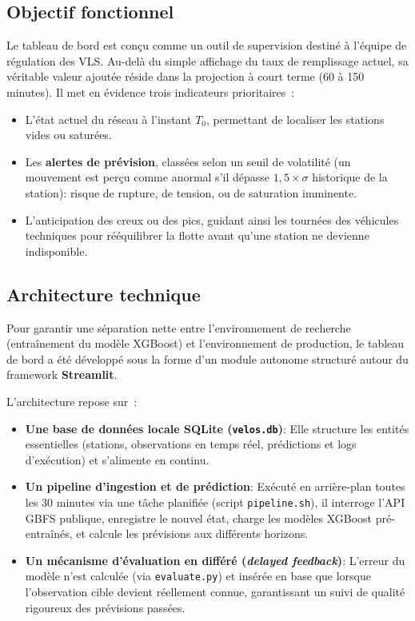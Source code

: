 \documentclass[fleqn, 12pt]{scrartcl}
\begin{document}
\subsection{Objectif fonctionnel}
Le tableau de bord est conçu comme un outil de supervision destiné à l'équipe de régulation des VLS\@. Au-delà du simple affichage du taux de remplissage actuel, sa véritable valeur ajoutée réside dans la projection à court terme (60 à 150 minutes). Il met en évidence trois indicateurs prioritaires~:
\begin{itemize}
    \item L'état actuel du réseau à l'instant $T_0$, permettant de localiser les stations vides ou saturées.
    \item Les \textbf{alertes de prévision}, classées selon un seuil de volatilité (un mouvement est perçu comme anormal s'il dépasse $1{,}5 \times \sigma$ historique de la station): risque de rupture, de tension, ou de saturation imminente.
    \item L'anticipation des creux ou des pics, guidant ainsi les tournées des véhicules techniques pour rééquilibrer la flotte avant qu'une station ne devienne indisponible.
\end{itemize}

\subsection{Architecture technique}
Pour garantir une séparation nette entre l'environnement de recherche (entraînement du modèle XGBoost) et l'environnement de production, le tableau de bord a été développé sous la forme d'un module autonome structuré autour du framework \textbf{Streamlit}.

L'architecture repose sur~:
\begin{itemize}
    \item \textbf{Une base de données locale SQLite (\texttt{velos.db})}: Elle structure les entités essentielles (stations, observations en temps réel, prédictions et logs d'exécution) et s'alimente en continu.
    \item \textbf{Un pipeline d'ingestion et de prédiction}: Exécuté en arrière-plan toutes les 30 minutes via une tâche planifiée (script \texttt{pipeline.sh}), il interroge l'API GBFS publique, enregistre le nouvel état, charge les modèles XGBoost pré-entraînés, et calcule les prévisions aux différents horizons.
    \item \textbf{Un mécanisme d'évaluation en différé (\emph{delayed feedback})}: L'erreur du modèle n'est calculée (via \texttt{evaluate.py}) et insérée en base que lorsque l'observation cible devient réellement connue, garantissant un suivi de qualité rigoureux des prévisions passées.
\end{itemize}
\end{document}
